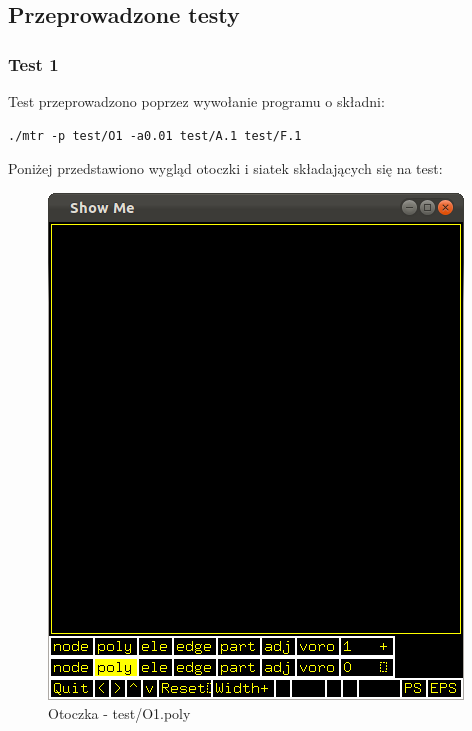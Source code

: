 \documentclass[a4paper,12pt,twoside]{article}
\begin{document}
\subsection{Przeprowadzone testy}

\subsubsection{Test 1}

Test przeprowadzono poprzez wywołanie programu o składni:
\begin{lstlisting}
./mtr -p test/O1 -a0.01 test/A.1 test/F.1
\end{lstlisting}

Poniżej przedstawiono wygląd otoczki i siatek składających się na test:

\begin{center}
	\begin{figure}[c]
	\includegraphics[scale=0.5]{img/O1.png}
	\caption{Otoczka - test/O1.poly}
\end{figure}


\end{center}
\end{document}
